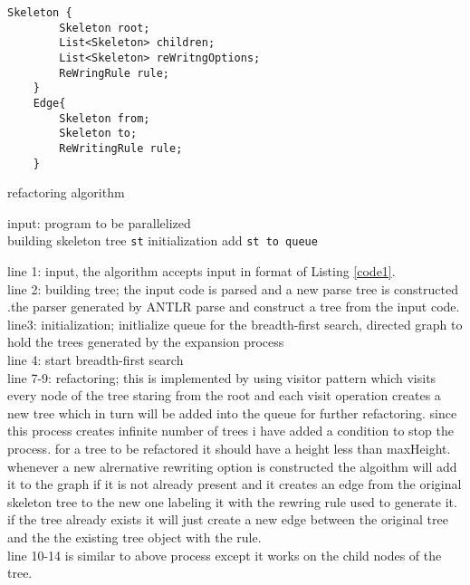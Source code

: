 \documentclass[12pt]{report}
\begin{document}
\begin{lstlisting}[caption={skeleton tree}, label={tree1}]
	Skeleton {
		Skeleton root;
		List<Skeleton> children;
		List<Skeleton> reWritngOptions;
		ReWringRule rule;
	}
	Edge{
		Skeleton from;
		Skeleton to;
		ReWritingRule rule;
	}
\end{lstlisting}
\begin{algorithm}[H]
\SetAlgoLined
 \caption {refactoring algorithm}\label{euclid}
  input: program to be parallelized\\
  building skeleton tree \texttt{st}\;
  initialization\;
  add \texttt{st to queue}\\

\end{algorithm}
line 1: input, the algorithm accepts input in format of  Listing \ref{code1}.\\
line 2: building tree; the input code is parsed and a new parse tree is constructed .the parser generated by ANTLR parse and construct a tree from the input code.\\
line3: initialization; initlialize queue for the breadth-first search, directed graph to hold the trees generated by the expansion process\\
line 4: start breadth-first search\\
line 7-9: refactoring; this is implemented by using visitor pattern which visits every node of the tree staring from the root and each visit operation creates a new tree which in turn will be added into the queue for further refactoring. since this process creates infinite number of trees i have added a condition to stop the process. for a tree to be refactored it should have a height less than maxHeight.
whenever a new alrernative rewriting option is constructed the algoithm will add it to the graph if it is not already present and it creates an edge from the original skeleton tree to the new one labeling it with the rewring rule used to generate it. if the tree already exists it will just create a new edge between the original tree and the the existing tree object with the rule. \\
line 10-14 is similar to above process except it works on the child nodes of the tree.
\end{document}

